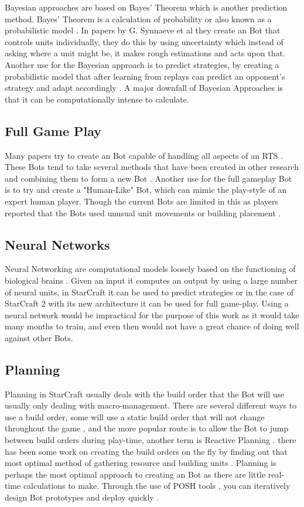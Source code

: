 \documentclass[journal]{IEEEtran}
\begin{document}
Bayesian approaches are based on Bayes' Theorem which is another prediction method. Bayes' Theorem is a calculation of probability or also known as a probabilistic model \cite{BayesianAI}. In papers by G. Synnaeve et al \cite{UnitsControl,SpecialTactics} they create an Bot that controls units individually, they do this by using uncertainty which instead of asking where a unit might be, it makes rough estimations and acts upon that. Another use for the Bayesian approach is to predict strategies, by creating a probabilistic model that after learning from replays can predict an opponent's strategy and adapt accordingly \cite{Bayesian}. A major downfall of Bayesian Approaches is that it can be computationally intense to calculate.

\subsection{Full Game Play}
Many papers try to create an Bot capable of handling all aspects of an RTS \cite{Agents,Hierarchical,HumanLevel,SCAIL}. These Bots tend to take several methods that have been created in other research and combining them to form a new Bot \cite{Agents}. Another use for the full gameplay Bot is to try and create a "Human-Like" Bot, which can mimic the play-style of an expert human player. Though the current Bots are limited in this as players reported that the Bots used unusual unit movements or building placement \cite{EvalHuman}.

\subsection{Neural Networks}
Neural Networking are computational models loosely based on the functioning of biological brains \cite{Deep}. Given an input it computes an output by using a large number of neural units, in StarCraft it can be used to predict strategies or in the case of StarCraft 2 with its new architecture it can be used for full game-play. Using a neural network would be impractical for the purpose of this work as it would take many months to train, and even then would not have a great chance of doing well against other Bots.

\subsection{Planning}
Planning in StarCraft usually deals with the build order that the Bot will use usually only dealing with macro-management. There are several different ways to use a build order, some will use a static build order that will not change throughout the game \cite{Swen}, and the more popular route is to allow the Bot to jump between build orders during play-time, another term is Reactive Planning \cite{Fuzzy,OnlineEvo,GoalDriven}. there has been some work on creating the build orders on the fly by finding out that most optimal method of gathering resource and building units \cite{BuildOrder}. Planning is perhaps the most optimal approach to creating an Bot as there are little real-time calculations to make. Through the use of POSH tools \cite{POSH}, you can iteratively design Bot prototypes and deploy quickly \cite{Swen}. 
\end{document}
